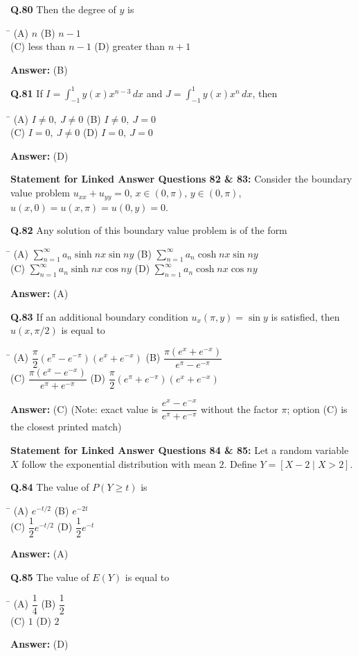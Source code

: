 \documentclass[11pt,a4paper]{article}
\newcommand{\optsfourA}[4]{%
  \begin{tabbing}
    \hspace{0.48\linewidth}\=\kill
    (A) #1 \> (B) #2 \\[2pt]
    (C) #3 \> (D) #4
  \end{tabbing}%
}
\newcommand{\ans}[1]{\textbf{Answer:} #1\par\medskip}
\begin{document}
\textbf{Q.80} Then the degree of $y$ is
\optsfourA{$n$}{$n - 1$}{less than $n - 1$}{greater than $n + 1$}
\ans{(B)}

\textbf{Q.81} If $I = \displaystyle\int_{-1}^{1} y(x) x^{n-3}\,dx$ and $J = \displaystyle\int_{-1}^{1} y(x) x^n\,dx$, then
\optsfourA{$I \ne 0,\ J \ne 0$}{$I \ne 0,\ J = 0$}{$I = 0,\ J \ne 0$}{$I = 0,\ J = 0$}
\ans{(D)}

\medskip
\textbf{Statement for Linked Answer Questions 82 \& 83:}
Consider the boundary value problem $u_{xx} + u_{yy} = 0$, $x \in (0, \pi)$, $y \in (0, \pi)$, $u(x, 0) = u(x, \pi) = u(0, y) = 0$.

\textbf{Q.82} Any solution of this boundary value problem is of the form
\optsfourA{$\displaystyle\sum_{n=1}^{\infty} a_n \sinh nx \sin ny$}{$\displaystyle\sum_{n=1}^{\infty} a_n \cosh nx \sin ny$}{$\displaystyle\sum_{n=1}^{\infty} a_n \sinh nx \cos ny$}{$\displaystyle\sum_{n=1}^{\infty} a_n \cosh nx \cos ny$}
\ans{(A)}

\textbf{Q.83} If an additional boundary condition $u_x(\pi, y) = \sin y$ is satisfied, then $u(x, \pi/2)$ is equal to
\optsfourA{$\dfrac{\pi}{2}(e^\pi - e^{-\pi})(e^x + e^{-x})$}{$\dfrac{\pi(e^x + e^{-x})}{e^\pi - e^{-\pi}}$}{$\dfrac{\pi(e^x - e^{-x})}{e^\pi + e^{-\pi}}$}{$\dfrac{\pi}{2}(e^\pi + e^{-\pi})(e^x + e^{-x})$}
\ans{(C) (Note: exact value is $\dfrac{e^x - e^{-x}}{e^\pi + e^{-\pi}}$ without the factor $\pi$; option (C) is the closest printed match)}

\medskip
\textbf{Statement for Linked Answer Questions 84 \& 85:}
Let a random variable $X$ follow the exponential distribution with mean $2$. Define $Y = [X - 2 \mid X > 2]$.

\textbf{Q.84} The value of $P(Y \ge t)$ is
\optsfourA{$e^{-t/2}$}{$e^{-2t}$}{$\dfrac{1}{2}e^{-t/2}$}{$\dfrac{1}{2}e^{-t}$}
\ans{(A)}

\textbf{Q.85} The value of $E(Y)$ is equal to
\optsfourA{$\dfrac{1}{4}$}{$\dfrac{1}{2}$}{$1$}{$2$}
\ans{(D)}
\end{document}
